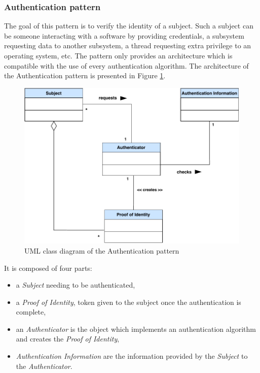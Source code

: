 \subsubsection{Authentication pattern}

The goal of this pattern is to verify the identity of a subject. Such a subject can be someone interacting with a software by providing credentials, a subsystem requesting data to another subsystem, a thread requesting extra privilege to an operating system, etc. The pattern only provides an architecture which is compatible with the use of every authentication algorithm. The architecture of the Authentication pattern is presented in Figure \ref{fig:my_label}.

\begin{figure}
    \centering
    \includegraphics[width=1\columnwidth]{utils/authenticator_CD.pdf}
    \caption{UML class diagram of the Authentication pattern}
    \label{fig:my_label}
\end{figure}

It is composed of four parts:
\begin{itemize}
    \item a \textit{Subject} needing to be authenticated,
    \item a \textit{Proof of Identity}, token given to the subject once the authentication is complete,
    \item an \textit{Authenticator} is the object which implements an authentication algorithm and creates the \textit{Proof of Identity},
    \item \textit{Authentication Information} are the information provided by the \textit{Subject} to the \textit{Authenticator}.

\end{itemize}

